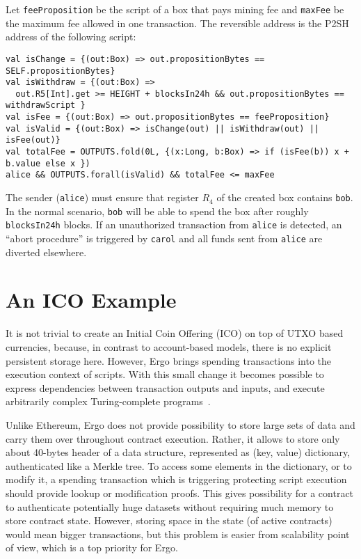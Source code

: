 \documentclass[11pt]{article}
\begin{document}
Let \texttt{feeProposition} be the script of a box that pays mining fee and \texttt{maxFee} be the maximum fee allowed in one transaction. The reversible address is the P2SH address of the following script:
\begin{verbatim}
val isChange = {(out:Box) => out.propositionBytes == SELF.propositionBytes}
val isWithdraw = {(out:Box) => 
  out.R5[Int].get >= HEIGHT + blocksIn24h && out.propositionBytes == withdrawScript }
val isFee = {(out:Box) => out.propositionBytes == feeProposition}
val isValid = {(out:Box) => isChange(out) || isWithdraw(out) || isFee(out)}
val totalFee = OUTPUTS.fold(0L, {(x:Long, b:Box) => if (isFee(b)) x + b.value else x })
alice && OUTPUTS.forall(isValid) && totalFee <= maxFee
\end{verbatim}

The sender (\texttt{alice}) must ensure that register $R_4$ of the created box contains \texttt{bob}. In the normal scenario, \texttt{bob} will be able to spend the box after roughly \texttt{blocksIn24h} blocks. If an unauthorized transaction from \texttt{alice} is detected, an ``abort procedure'' is triggered by \texttt{carol} and all funds sent from \texttt{alice} are diverted elsewhere. %


\section{An ICO Example}
\label{ico}
It is not trivial to create an Initial Coin Offering (ICO) on top of UTXO based currencies, because, in contrast to account-based models, there is no explicit persistent storage here. However, Ergo brings spending transactions into the execution context of scripts. With this small change it becomes possible to express dependencies between transaction outputs and inputs, and execute arbitrarily complex Turing-complete programs~\cite{CKM18a}. 

Unlike Ethereum, Ergo does not provide possibility to store large sets of data and carry them over throughout contract execution. Rather, it allows to store only about 40-bytes header of a data structure, represented as (key, value) dictionary, authenticated like a Merkle tree. To access some elements in the dictionary, or to modify it, a spending transaction which is triggering protecting script execution should provide lookup or modification proofs. This gives possibility for a contract to authenticate potentially huge datasets without requiring much memory to store contract state. However, storing space in the state (of active contracts) would mean bigger transactions, but this problem is easier from scalability point of view, which is a top priority for Ergo.
\end{document}
